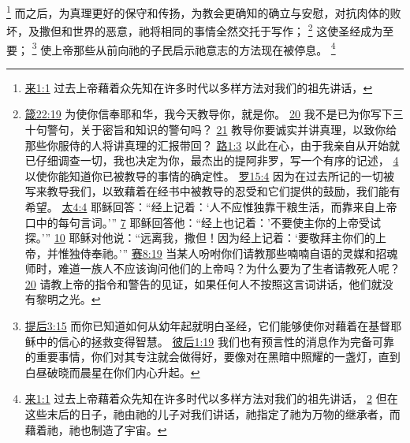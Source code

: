 \documentclass[12pt, a4paper, oneside]{ctexart}
\begin{document}
	\footnote {
		\href{https://biblehub.com/hebrews/1-1.htm}{来1:1} 过去上帝藉着众先知在许多时代以多样方法对我们的祖先讲话，
	}
	而之后，为真理更好的保守和传扬，为教会更确知的确立与安慰，对抗肉体的败坏，及撒但和世界的恶意，祂将相同的事情全然交托于写作；
	\footnote {
		\href{https://biblehub.com/proverbs/22-19.htm}{箴22:19} 为使你信奉耶和华，我今天教导你，就是你。
		\href{https://biblehub.com/proverbs/22-20.htm}{20} 我不是已为你写下三十句警句，关于密旨和知识的警句吗？
		\href{https://biblehub.com/proverbs/22-21.htm}{21} 教导你要诚实并讲真理，以致你给那些你服侍的人将讲真理的汇报带回？ 
		\href{https://biblehub.com/luke/1-3.htm}{路1:3} 以此在心，由于我亲自从开始就已仔细调查一切，我也决定为你，最杰出的提阿非罗，写一个有序的记述，
		\href{https://biblehub.com/luke/1-4.htm}{4} 以使你能知道你已被教导的事情的确定性。
		\href{https://biblehub.com/romans/15-4.htm}{罗15:4} 因为在过去所记的一切被写来教导我们，以致藉着在经书中被教导的忍受和它们提供的鼓励，我们能有希望。
		\href{https://biblehub.com/matthew/4-4.htm}{太4:4} 耶稣回答：“经上记着：‘人不应惟独靠干粮生活，而靠来自上帝口中的每句言词。’” 
		\href{https://biblehub.com/matthew/4-7.htm}{7} 耶稣回答他：“经上也记着：'不要使主你的上帝受试探。’”
		\href{https://biblehub.com/matthew/4-10.htm}{10} 耶稣对他说：“远离我，撒但！因为经上记着：‘要敬拜主你们的上帝，并惟独侍奉祂。’”
		\href{https://biblehub.com/isaiah/8-19.htm}{赛8:19} 当某人吩咐你们请教那些喃喃自语的灵媒和招魂师时，难道一族人不应该询问他们的上帝吗？为什么要为了生者请教死人呢？
		\href{https://biblehub.com/isaiah/8-20.htm}{20} 请教上帝的指令和警告的见证，如果任何人不按照这言词讲话，他们就没有黎明之光。
	}
	这使圣经成为至要；
	\footnote {
		\href{https://biblehub.com/2_timothy/3-15.htm}{提后3:15} 而你已知道如何从幼年起就明白圣经，它们能够使你对藉着在基督耶稣中的信心的拯救变得智慧。
		\href{https://biblehub.com/2_peter/1-19.htm}{彼后1:19} 我们也有预言性的消息作为完备可靠的重要事情，你们对其专注就会做得好，要像对在黑暗中照耀的一盏灯，直到白昼破晓而晨星在你们内心升起。
	}
	使上帝那些从前向祂的子民启示祂意志的方法现在被停息。
	\footnote {
		\href{https://biblehub.com/hebrews/1-1.htm}{来1:1} 过去上帝藉着众先知在许多时代以多样方法对我们的祖先讲话，
		\href{https://biblehub.com/hebrews/1-2.htm}{2} 但在这些末后的日子，祂由祂的儿子对我们讲话，祂指定了祂为万物的继承者，而藉着祂，祂也制造了宇宙。
	}
\end{document}
